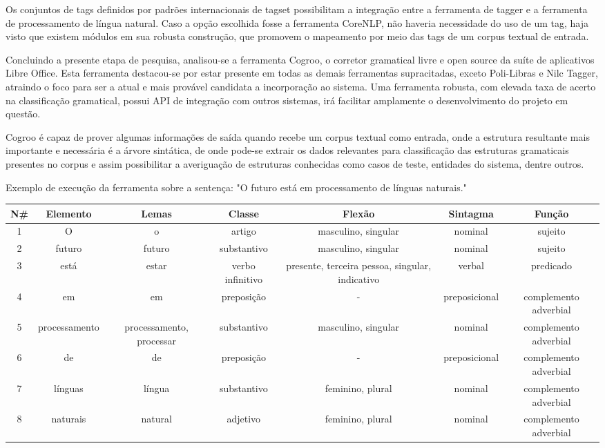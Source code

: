 Os conjuntos de tags definidos por padrões internacionais de tagset possibilitam a integração entre a ferramenta de tagger e a ferramenta de processamento de língua natural. Caso a opção escolhida fosse a ferramenta CoreNLP, não haveria necessidade do uso de um tag, haja visto que existem módulos em sua robusta construção, que promovem o mapeamento por meio das tags de um corpus textual de entrada.

Concluindo a presente etapa de pesquisa, analisou-se a ferramenta Cogroo, o corretor gramatical livre e open source da suíte de aplicativos Libre Office. Esta ferramenta destacou-se por estar presente em todas as demais ferramentas supracitadas, exceto Poli-Libras e Nilc Tagger, atraindo o foco para ser a atual e mais provável candidata a incorporação ao sistema. Uma ferramenta robusta, com elevada taxa de acerto na classificação gramatical, possui API de integração com outros sistemas, irá facilitar amplamente o desenvolvimento do projeto em questão.

Cogroo é capaz de prover algumas informações de saída quando recebe um corpus textual como entrada, onde a estrutura resultante mais importante e necessária é a árvore sintática, de onde pode-se extrair os dados relevantes para classificação das estruturas gramaticais presentes no corpus e assim possibilitar a averiguação de estruturas conhecidas como casos de teste, entidades do sistema, dentre outros.

\begin{quadro}[H]
  \begin{center}
    \caption{Exemplo de execução da ferramenta sobre a sentença: "O futuro está em processamento de línguas naturais."} 
    \label{tab:exemplo}
    \vspace{0.1cm}
    \footnotesize
    \begin{tabular}{|c|c|c|c|c|c|c|}
      \hline
      N# & Elemento & Lemas & Classe & Flexão & Sintagma & Função \\
      \hline
      \hline
      1 & O & o & artigo & masculino, singular & nominal & sujeito\\
      2 & futuro & futuro & substantivo & masculino, singular & nominal & sujeito\\
      3 & está & estar & verbo infinitivo & presente, terceira pessoa, singular, indicativo & verbal & predicado\\
      4 & em & em & preposição & - & preposicional & complemento adverbial\\
      5 & processamento & processamento, processar & substantivo & masculino, singular & nominal & complemento adverbial\\
      6 & de & de & preposição & - & preposicional & complemento adverbial\\
      7 & línguas & língua & substantivo & feminino, plural & nominal & complemento adverbial\\
      8 & naturais & natural & adjetivo & feminino, plural & nominal & complemento adverbial\\
      \hline 
    \end{tabular}
  \end{center}
\end{quadro}

